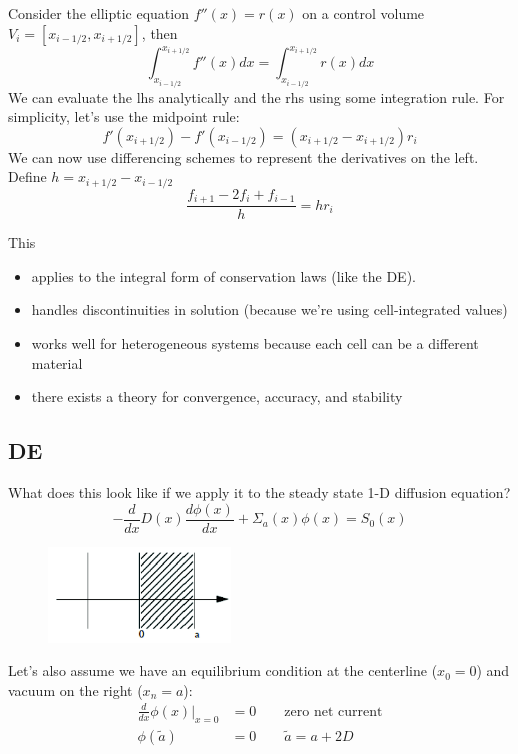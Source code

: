 \documentclass[12pt]{article}
\begin{document}
Consider the elliptic equation $f''(x) = r(x)$ on a control volume $V_i = [x_{i-1/2}, x_{i+1/2}]$, then
\[\int_{x_{i-1/2}}^{x_{i+1/2}} f''(x)dx = \int_{x_{i-1/2}}^{x_{i+1/2}} r(x) dx\]
%
We can evaluate the lhs analytically and the rhs using some integration rule. For simplicity, let's use the midpoint rule:
%
\[f'(x_{i+1/2}) - f'(x_{i-1/2}) = (x_{i+1/2} - x_{i+1/2})r_i\]
%
We can now use differencing schemes to represent the derivatives on the left. Define $h = x_{i+1/2} - x_{i-1/2}$
\[\frac{f_{i+1} - 2f_i + f_{i-1}}{h} = hr_i\]

This
\begin{itemize}
\item applies to the integral form of conservation laws (like the DE).
\item handles discontinuities in solution (because we're using cell-integrated values)
\item works well for heterogeneous systems because each cell can be a different material
\item there exists a theory for convergence, accuracy, and stability
\end{itemize}


\subsection{DE} 
What does this look like if we apply it to the steady state 1-D diffusion equation?
\[-\frac{d}{dx}D(x)\frac{d \phi(x)}{dx} + \Sigma_a(x) \phi(x) = S_0(x)\]
%
\begin{figure}[h!]
\includegraphics[height=1in]{FVM-fig}
\end{figure}
%
Let's also assume we have an equilibrium condition at the centerline ($x_0 = 0$) and vacuum on the right ($x_n = a$):
\begin{align}
\frac{d}{dx}\phi(x) \big|_{x=0} &= 0 \qquad \text{zero net current} \nonumber\\
\phi(\tilde{a}) &= 0 \qquad \tilde{a} = a + 2D \nonumber
\end{align}
\end{document}

